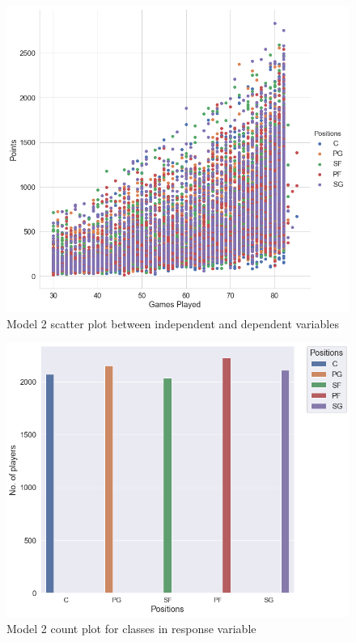 \documentclass[format=sigconf]{acmart}
\begin{document}
\begin{figure}[H]
    \centering
    \includegraphics[scale=0.25]{images/model_2_scatter_plot.png}
    \caption{Model 2 scatter plot between independent and dependent variables}
    \label{fig:model2scatter}
\end{figure}
\begin{figure}[H]
    \centering
    \includegraphics[scale=0.25]{images/model_2_bar_plot.png}
    \caption{Model 2 count plot for classes in response variable}
    \label{fig:model2bar}
\end{figure}
\end{document}
